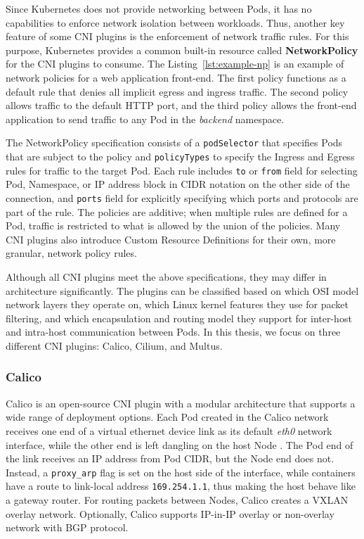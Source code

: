 \documentclass[english, 12pt, a4paper, sci, utf8, a-2b, online]{aaltothesis}
\begin{document}
Since Kubernetes does not provide networking between Pods, it has no capabilities to enforce network isolation between workloads.
Thus, another key feature of some CNI plugins is the enforcement of network traffic rules.
For this purpose, Kubernetes provides a common built-in resource called \textbf{NetworkPolicy} for the CNI plugins to consume.
The Listing~\ref{lst:example-np} is an example of network policies for a web application front-end.
The first policy functions as a default rule that denies all implicit egress and ingress traffic.
The second policy allows traffic to the default HTTP port, and the third policy allows the front-end application to send traffic to any Pod in the \emph{backend} namespace.



The NetworkPolicy specification consists of a \lstinline{podSelector} that specifies Pods that are subject to the policy and \lstinline{policyTypes} to specify the Ingress and Egress rules for traffic \cite{budigiri2021network} to the target Pod.
Each rule includes \lstinline{to} or \lstinline{from} field for selecting Pod, Namespace, or IP address block in CIDR notation on the other side of the connection, and \lstinline{ports} field for explicitly specifying which ports and protocols are part of the rule.
The policies are additive; when multiple rules are defined for a Pod, traffic is restricted to what is allowed by the union of the policies.
Many CNI plugins also introduce Custom Resource Definitions for their own, more granular, network policy rules.

Although all CNI plugins meet the above specifications, they may differ in architecture significantly.
The plugins can be classified based on which OSI model network layers they operate on, which Linux kernel features they use for packet filtering, and which encapsulation and routing model they support for inter-host and intra-host communication between Pods.
In this thesis, we focus on three different CNI plugins: Calico, Cilium, and Multus.

\subsubsection{Calico}

Calico \cite{calico} is an open-source CNI plugin with a modular architecture that supports a wide range of deployment options.
Each Pod created in the Calico network receives one end of a virtual ethernet device link as its default \emph{eth0} network interface, while the other end is left dangling on the host Node \cite{calico-tkng}.
The Pod end of the link receives an IP address from Pod CIDR, but the Node end does not.
Instead, a \lstinline{proxy_arp} flag is set on the host side of the interface, while containers have a route to link-local address \lstinline{169.254.1.1}, thus making the host behave like a gateway router.
For routing packets between Nodes, Calico creates a VXLAN overlay network.
Optionally, Calico supports IP-in-IP overlay or non-overlay network with BGP protocol.
\end{document}
